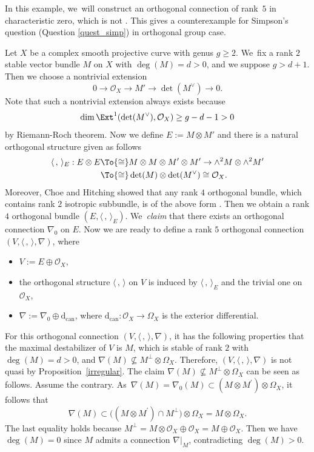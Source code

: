 \begin{examp}\label{exmp_char_zero}
In this example, we~will construct an orthogonal connection of rank~$5$ in characteristic zero, which is not \grsemistable. This gives a counterexample for Simpson's question (Question \ref{quest_simp}) in orthogonal group case.

Let $X$ be a complex smooth projective curve with genus $g \geq 2$. We~fix a rank $2$ stable vector bundle $M$ on $X$ with $\deg(M)=d>0$, and we suppose $g > d+1$. Then we choose a nontrivial extension
\[
0 \to \mathcal{O}_X \to M' \to \det(M^{\vee}) \to 0.
\]
Note that such a nontrivial extension always exists because
\[
\dim \Ext^1(\det(M^{\vee}), \mathcal{O}_X ) \geq g-d-1 > 0
\]
by Riemann-Roch theorem. Now we define $E := M \otimes M'$ and there is a natural orthogonal structure given as follows
\begin{align*}
\langle \,, \, \rangle_E : E \otimes E & \To{\cong} M \otimes M \otimes M' \otimes M' \to \wedge^2 M \otimes \wedge^2 M' \\
& \To{\cong} \det(M) \otimes \det(M^{\vee}) \cong \mathcal{O}_X.
\end{align*}
Moreover, Choe and Hitching showed that any rank $4$ orthogonal bundle, which contains rank $2$ isotropic subbundle, is of the above form \cite[Th.\,4.2]{CH23}. Then we obtain a rank $4$ orthogonal bundle $(E, \langle \,, \, \rangle_E)$. We~\emph{claim} that there exists an orthogonal connection $\nabla_0$ on $E$. Now we are ready to define a rank $5$ orthogonal connection $(V, \langle \,, \, \rangle, \nabla)$, where
\begin{itemize}
\item $V:= E \oplus \mathcal{O}_X$,
\item the orthogonal structure $\langle \,, \, \rangle$ on $V$ is induced by $\langle \,, \, \rangle_E$ and the trivial one on $\mathcal{O}_X$,
\item $\nabla:=\nabla_0 \oplus \mathrm{d}_\mathrm{can}$, where $\mathrm{d}_\mathrm{can}: \mathcal{O}_X \to \Omega_X$ is the exterior differential.
\end{itemize}
For this orthogonal connection $(V, \langle \,, \, \rangle, \nabla)$, it has the following properties that the maximal destabilizer of $V$ is $M$, which is stable of rank $2$ with $\deg (M) =d > 0$, and $\nabla(M) \nsubseteq M^{\perp} \otimes \Omega_X$. Therefore, $(V, \langle \,, \, \rangle, \nabla)$ is not quasi \grsemistable by Proposition~\ref{irregular}. The claim $\nabla(M) \nsubseteq M^{\perp} \otimes \Omega_X$ can be seen as follows. Assume the contrary. As~$\nabla(M)=\nabla_0(M)\subset (M\otimes M^\prime)\otimes \Omega_X$, it follows that
\[
\nabla(M)\subset \big((M\otimes M^\prime)\cap M^{\perp}\big)\otimes \Omega_X=M\otimes \Omega_X.
\]
The last equality holds because $M^{\perp}=M\otimes \mathcal{O}_X\oplus \mathcal{O}_X=M\oplus \mathcal{O}_X$. Then we have $\deg(M)=0$ since $M$ admits a connection $\nabla|_{M}$, contradicting $\deg(M)>0$.


\end{examp}
